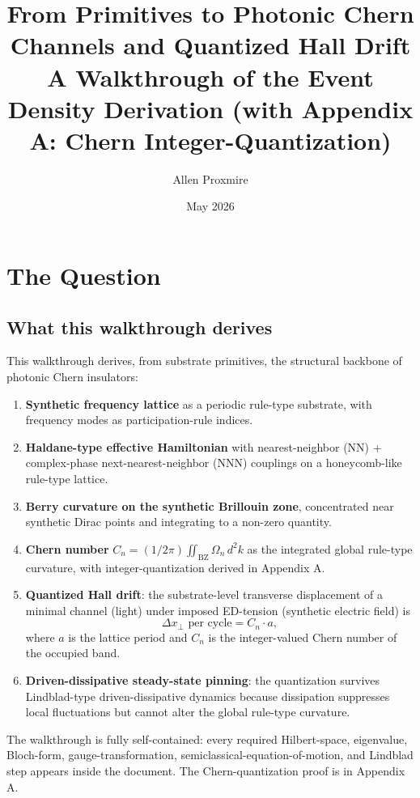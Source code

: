 \documentclass[11pt,a4paper]{article}
\title{\vspace{-1cm}\Large\bfseries From Primitives to Photonic Chern Channels and Quantized Hall Drift\\[6pt]
\large\mdseries A Walkthrough of the Event Density Derivation (with Appendix A: Chern Integer-Quantization)}
\author{Allen Proxmire}
\date{May 2026}
\begin{document}
\maketitle
\thispagestyle{empty}

\section{The Question}

\subsection*{What this walkthrough derives}

This walkthrough derives, from substrate primitives, the structural backbone of photonic Chern insulators:

\begin{enumerate}[noitemsep]
  \item \textbf{Synthetic frequency lattice} as a periodic rule-type substrate, with frequency modes as participation-rule indices.
  \item \textbf{Haldane-type effective Hamiltonian} with nearest-neighbor (NN) + complex-phase next-nearest-neighbor (NNN) couplings on a honeycomb-like rule-type lattice.
  \item \textbf{Berry curvature on the synthetic Brillouin zone}, concentrated near synthetic Dirac points and integrating to a non-zero quantity.
  \item \textbf{Chern number} $C_n = (1/2\pi)\iint_{\mathrm{BZ}}\Omega_n\, d^2k$ as the integrated global rule-type curvature, with integer-quantization derived in Appendix A.
  \item \textbf{Quantized Hall drift}: the substrate-level transverse displacement of a minimal channel (light) under imposed ED-tension (synthetic electric field) is
  \[
  \Delta x_{\perp} \text{ per cycle} = C_n \cdot a,
  \]
  where $a$ is the lattice period and $C_n$ is the integer-valued Chern number of the occupied band.
  \item \textbf{Driven-dissipative steady-state pinning}: the quantization survives Lindblad-type driven-dissipative dynamics because dissipation suppresses local fluctuations but cannot alter the global rule-type curvature.
\end{enumerate}

The walkthrough is fully self-contained: every required Hilbert-space, eigenvalue, Bloch-form, gauge-transformation, semiclassical-equation-of-motion, and Lindblad step appears inside the document. The Chern-quantization proof is in Appendix A.
\end{document}
